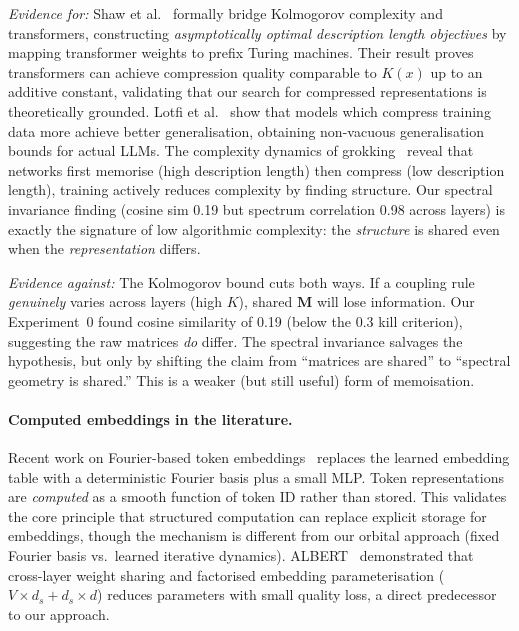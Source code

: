 \documentclass[11pt, a4paper]{article}
\newcommand{\M}{\mathbf{M}}
\theoremstyle{remark}
\begin{document}
\textit{Evidence for:}
Shaw et al.~\cite{shaw2026kolmogorov} formally bridge Kolmogorov complexity and transformers, constructing \emph{asymptotically optimal description length objectives} by mapping transformer weights to prefix Turing machines.
Their result proves transformers can achieve compression quality comparable to $K(x)$ up to an additive constant, validating that our search for compressed representations is theoretically grounded.
Lotfi et al.~\cite{lotfi2024compression} show that models which compress training data more achieve better generalisation, obtaining non-vacuous generalisation bounds for actual LLMs.
The complexity dynamics of grokking~\cite{demoss2024grokking} reveal that networks first memorise (high description length) then compress (low description length), training actively reduces complexity by finding structure.
Our spectral invariance finding (cosine sim 0.19 but spectrum correlation 0.98 across layers) is exactly the signature of low algorithmic complexity: the \emph{structure} is shared even when the \emph{representation} differs.

\textit{Evidence against:}
The Kolmogorov bound cuts both ways. If a coupling rule \emph{genuinely} varies across layers (high $K$), shared $\M$ will lose information.
Our Experiment~0 found cosine similarity of 0.19 (below the 0.3 kill criterion), suggesting the raw matrices \emph{do} differ.
The spectral invariance salvages the hypothesis, but only by shifting the claim from ``matrices are shared'' to ``spectral geometry is shared.''
This is a weaker (but still useful) form of memoisation.

\paragraph{Computed embeddings in the literature.}
Recent work on Fourier-based token embeddings~\cite{fourier2025embeddings} replaces the learned embedding table with a deterministic Fourier basis plus a small MLP.
Token representations are \emph{computed} as a smooth function of token ID rather than stored.
This validates the core principle that structured computation can replace explicit storage for embeddings, though the mechanism is different from our orbital approach (fixed Fourier basis vs.\ learned iterative dynamics).
ALBERT~\cite{lan2020albert} demonstrated that cross-layer weight sharing and factorised embedding parameterisation ($V \times d_s + d_s \times d$) reduces parameters with small quality loss, a direct predecessor to our approach.
\end{document}
